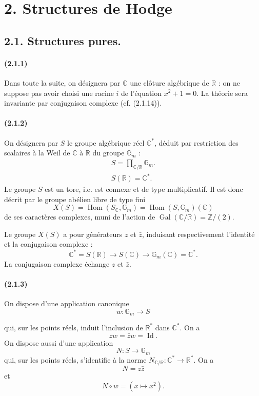 \documentclass[10pt]{article}
\newcommand{\C}{\mathbb C}
\newcommand{\Z}{\mathbb Z}
\newcommand{\Hom}{\operatorname{Hom}}
\newcommand{\R}{\mathbb R}
\newcommand{\Gm}{\mathbb G_m}
\newcommand{\Gal}{\operatorname{Gal}}
\begin{document}
\section*{2. Structures de Hodge}
\subsection*{2.1. Structures pures.}

\paragraph{(2.1.1)} Dans toute la suite, on désignera par $\C$ une clôture algébrique de $\R$ : on ne suppose pas avoir choisi une racine $i$ de l'équation $x^2+1=0$. La théorie sera invariante par conjugaison complexe (cf. (2.1.14)).

\paragraph{(2.1.2)} On désignera par $S$ le groupe algébrique réel $\C^*$, déduit par restriction des scalaires à la Weil de $\C$ à $\R$ du groupe $\Gm$ :
\[
\begin{gathered}
S=\prod_{\C/\R}\Gm.\\
S(\R)=\C^*.
\end{gathered}
\]
Le groupe $S$ est un tore, i.e. est connexe et de type multiplicatif. Il est donc décrit par le groupe abélien libre de type fini
\[
X(S)=\Hom(S_\C,\Gm)=\Hom(S,\Gm)(\C)
\]
de ses caractères complexes, muni de l'action de $\Gal(\C/\R)=\Z/(2)$.

Le groupe $X(S)$ a pour générateurs $z$ et $\bar z$, induisant respectivement l'identité et la conjugaison complexe :
\[
\C^*=S(\R)\longrightarrow S(\C)\longrightarrow \Gm(\C)=\C^*.
\]
La conjugaison complexe échange $z$ et $\bar z$.

\paragraph{(2.1.3)} On dispose d'une application canonique
\[
\tag{2.1.3.1}
w:\Gm\longrightarrow S
\]




qui, sur les points réels, induit l'inclusion de $\R^*$ dans $\C^*$. On a
\[
\tag{2.1.3.2}
z w=\bar z w=\operatorname{Id}.
\]
On dispose aussi d'une application
\[
\tag{2.1.3.3}
N:S\longrightarrow\Gm
\]
qui, sur les points réels, s'identifie à la norme $N_{\C/\R}:\C^*\to\R^*$. On a
\[
\tag{2.1.3.4}
N=z\bar z
\]
et
\[
\tag{2.1.3.5}
N\circ w=(x\mapsto x^2).
\]
\end{document}
